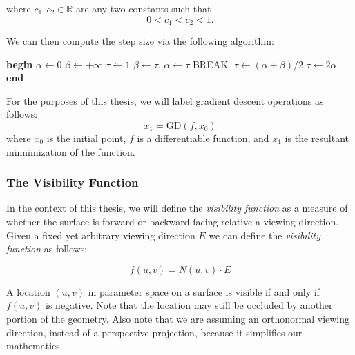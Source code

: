 \documentclass[12pt, letterpaper]{article}
\begin{document}
		where $c_{1}, c_{2} \in \mathbb{R}$ are any two constants such that $$0 < c_{1} < c_{2} < 1.$$

		We can then compute the step size via the following algorithm: %

		\begin{algorithm}
		\label{alg:step_size}
		\begin{algorithmic}
			\STATE \textbf{begin}
			\STATE $\alpha \leftarrow 0$
			\STATE $\beta \leftarrow +\infty$
			\STATE $\tau \leftarrow 1$
			\REPEAT
					\STATE $\beta \leftarrow \tau.$
					\STATE $\alpha \leftarrow \tau$
				\ELSE 
					\STATE BREAK.
				\ENDIF
				\IF{ $\beta < +\infty$}
					\STATE $\tau \leftarrow (\alpha + \beta)/2$
				\ELSE
					\STATE $\tau \leftarrow 2 \alpha$
				\ENDIF
			\STATE \textbf{end}

		\end{algorithmic}
		\end{algorithm}

		For the purposes of this thesis, we will label gradient descent operations as follows:
		$$ x_{1} = \text{GD}(f, x_{0})$$ where $x_{0}$ is the initial point, $f$ is a differentiable function, and $x_{1}$ is the resultant minnimization of the function.
		
		\subsubsection{The Visibility Function}

		In the context of this thesis, we will define the \emph{visibility function} as a measure of
		whether the surface is forward or backward facing relative a viewing direction.
		Given a fixed yet arbitrary viewing direction $E$ we can define the \emph{visibility function} as follows:

		$$f(u, v) = N(u, v) \cdot E$$

		A location $(u, v)$ in parameter space on a surface is visible if and only if $f(u, v)$ is negative.
		Note that the location may still be occluded by another portion of the geometry.
		Also note that we are assuming an orthonormal viewing direction, instead of a perspective projection,
		because it simplifies our mathematics. \cite{XJY98}
\end{document}
